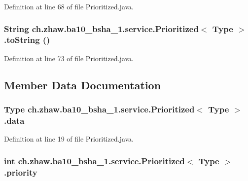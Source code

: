 Definition at line 68 of file Prioritized.java.\hypertarget{classch_1_1zhaw_1_1ba10__bsha__1_1_1service_1_1Prioritized_3_01Type_01_4_a74474d05201ad576585d29eeab69de45}{
\subsubsection[{toString}]{\setlength{\rightskip}{0pt plus 5cm}String ch.zhaw.ba10\_\-bsha\_\-1.service.Prioritized$<$ Type $>$.toString ()}}
\label{classch_1_1zhaw_1_1ba10__bsha__1_1_1service_1_1Prioritized_3_01Type_01_4_a74474d05201ad576585d29eeab69de45}


Definition at line 73 of file Prioritized.java.

\subsection{Member Data Documentation}
\hypertarget{classch_1_1zhaw_1_1ba10__bsha__1_1_1service_1_1Prioritized_3_01Type_01_4_ac981f72cd0ff5d5ad2b9505b95e6cb27}{
\subsubsection[{data}]{\setlength{\rightskip}{0pt plus 5cm}Type ch.zhaw.ba10\_\-bsha\_\-1.service.Prioritized$<$ Type $>$.{\bf data}}}
\label{classch_1_1zhaw_1_1ba10__bsha__1_1_1service_1_1Prioritized_3_01Type_01_4_ac981f72cd0ff5d5ad2b9505b95e6cb27}


Definition at line 19 of file Prioritized.java.\hypertarget{classch_1_1zhaw_1_1ba10__bsha__1_1_1service_1_1Prioritized_3_01Type_01_4_aac367233c3f10ee7df9855347d2e5e7b}{
\subsubsection[{priority}]{\setlength{\rightskip}{0pt plus 5cm}int ch.zhaw.ba10\_\-bsha\_\-1.service.Prioritized$<$ Type $>$.{\bf priority}}}
\label{classch_1_1zhaw_1_1ba10__bsha__1_1_1service_1_1Prioritized_3_01Type_01_4_aac367233c3f10ee7df9855347d2e5e7b}


